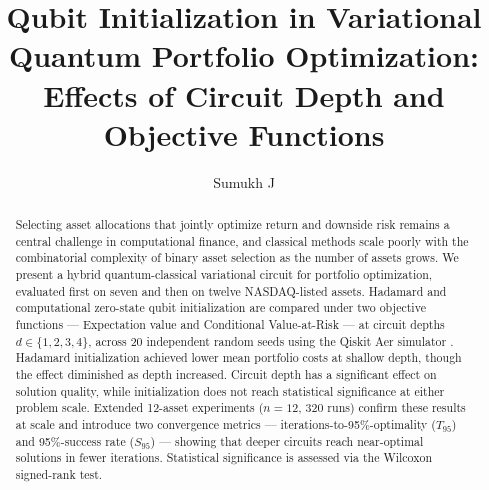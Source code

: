 \documentclass[runningheads]{llncs}
\begin{document}
\title{Qubit Initialization in Variational Quantum Portfolio Optimization: Effects of Circuit Depth and Objective Functions}


\author{Sumukh J}



\maketitle

\begin{abstract}
Selecting asset allocations that jointly optimize return and downside risk remains a central challenge in computational finance, and classical methods scale poorly with the combinatorial complexity of binary asset selection as the number of assets grows. We present a hybrid quantum-classical variational circuit for portfolio optimization, evaluated first on seven and then on twelve NASDAQ-listed assets. Hadamard and computational zero-state qubit initialization are compared under two objective functions --- Expectation value and Conditional Value-at-Risk --- at circuit depths $d \in \{1, 2, 3, 4\}$, across 20 independent random seeds using the Qiskit Aer simulator \cite{qiskit}. Hadamard initialization achieved lower mean portfolio costs at shallow depth, though the effect diminished as depth increased. Circuit depth has a significant effect on solution quality, while initialization does not reach statistical significance at either problem scale. Extended 12-asset experiments ($n = 12$, 320 runs) confirm these results at scale and introduce two convergence metrics --- iterations-to-95\%-optimality ($T_{95}$) and 95\%-success rate ($S_{95}$) --- showing that deeper circuits reach near-optimal solutions in fewer iterations. Statistical significance is assessed via the Wilcoxon signed-rank test.

\end{abstract}
\end{document}

